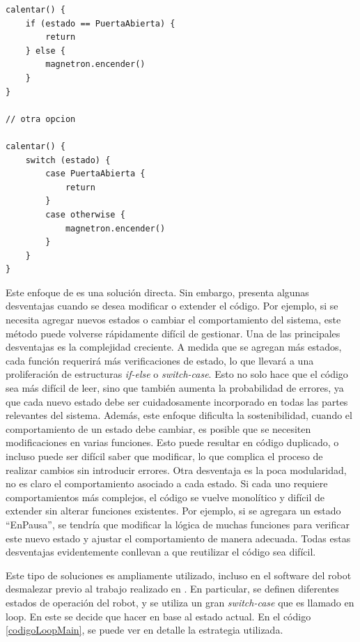 \begin{lstlisting}[style=seudocode,label=codigoMicro,caption={Ejemplo de manejo de estados tradicional, en el caso del microondas.}]
calentar() {
    if (estado == PuertaAbierta) {
        return
    } else {
        magnetron.encender()
    }
}

// otra opcion

calentar() {
    switch (estado) {
    	case PuertaAbierta {
        	return
        }
    	case otherwise {
    	    magnetron.encender()
	    }
	}
}

\end{lstlisting}

Este enfoque de es una solución directa. Sin embargo, presenta algunas desventajas cuando se desea modificar o extender el código. Por ejemplo, si se necesita agregar nuevos estados o cambiar el comportamiento del sistema, este método puede volverse rápidamente difícil de gestionar. Una de las principales desventajas es la complejidad creciente. A medida que se agregan más estados, cada función requerirá más verificaciones de estado, lo que llevará a una proliferación de estructuras \textit{if-else} o \textit{switch-case}. Esto no solo hace que el código sea más difícil de leer, sino que también aumenta la probabilidad de errores, ya que cada nuevo estado debe ser cuidadosamente incorporado en todas las partes relevantes del sistema. Además, este enfoque dificulta la sostenibilidad, cuando el comportamiento de un estado debe cambiar, es posible que se necesiten modificaciones en varias funciones. Esto puede resultar en código duplicado, o incluso puede ser difícil saber que modificar, lo que complica el proceso de realizar cambios sin introducir errores. Otra desventaja es la poca modularidad, no es claro el comportamiento asociado a cada estado. Si cada uno requiere comportamientos más complejos, el código se vuelve monolítico y difícil de extender sin alterar funciones existentes. Por ejemplo, si se agregara un estado ``EnPausa'', se tendría que modificar la lógica de muchas funciones para verificar este nuevo estado y ajustar el comportamiento de manera adecuada. Todas estas desventajas evidentemente conllevan a que reutilizar el código sea difícil.

Este tipo de soluciones es ampliamente utilizado, incluso en el software del robot desmalezar previo al trabajo realizado en \cite{paperPomponio}. En particular, se definen diferentes estados de operación del robot, y se utiliza un gran \textit{switch-case} que es llamado en loop. En este se decide que hacer en base al estado actual. En el código \ref{codigoLoopMain}, se puede ver en detalle la estrategia utilizada.


